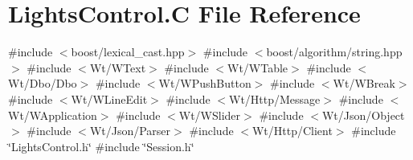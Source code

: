\hypertarget{_lights_control_8_c}{}\section{Lights\+Control.\+C File Reference}
\label{_lights_control_8_c}
{\ttfamily \#include $<$boost/lexical\+\_\+cast.\+hpp$>$}\newline
{\ttfamily \#include $<$boost/algorithm/string.\+hpp$>$}\newline
{\ttfamily \#include $<$Wt/\+W\+Text$>$}\newline
{\ttfamily \#include $<$Wt/\+W\+Table$>$}\newline
{\ttfamily \#include $<$Wt/\+Dbo/\+Dbo$>$}\newline
{\ttfamily \#include $<$Wt/\+W\+Push\+Button$>$}\newline
{\ttfamily \#include $<$Wt/\+W\+Break$>$}\newline
{\ttfamily \#include $<$Wt/\+W\+Line\+Edit$>$}\newline
{\ttfamily \#include $<$Wt/\+Http/\+Message$>$}\newline
{\ttfamily \#include $<$Wt/\+W\+Application$>$}\newline
{\ttfamily \#include $<$Wt/\+W\+Slider$>$}\newline
{\ttfamily \#include $<$Wt/\+Json/\+Object$>$}\newline
{\ttfamily \#include $<$Wt/\+Json/\+Parser$>$}\newline
{\ttfamily \#include $<$Wt/\+Http/\+Client$>$}\newline
{\ttfamily \#include \char`\"{}Lights\+Control.\+h\char`\"{}}\newline
{\ttfamily \#include \char`\"{}Session.\+h\char`\"{}}\newline
